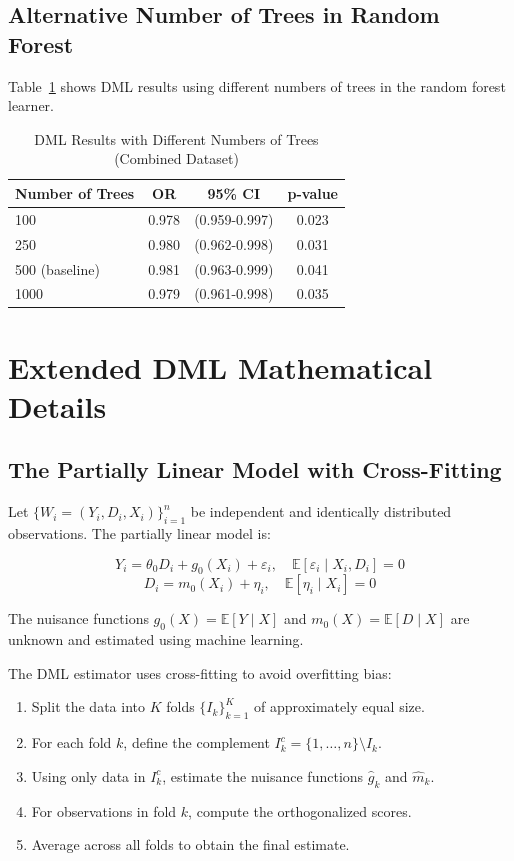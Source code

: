 \subsection{Alternative Number of Trees in Random Forest}

Table~\ref{tab:appendix_trees} shows DML results using different numbers of trees in the random forest learner.

\begin{table}[htbp]
	\centering
	\caption{DML Results with Different Numbers of Trees (Combined Dataset)}
	\label{tab:appendix_trees}
	\begin{tabular}{@{}lccc@{}}
		\toprule
		\textbf{Number of Trees} & \textbf{OR} & \textbf{95\% CI} & \textbf{p-value} \\
		\midrule
		100 & 0.978 & (0.959-0.997) & 0.023 \\
		250 & 0.980 & (0.962-0.998) & 0.031 \\
		500 (baseline) & 0.981 & (0.963-0.999) & 0.041 \\
		1000 & 0.979 & (0.961-0.998) & 0.035 \\
		\bottomrule
	\end{tabular}
\end{table}

\section{Extended DML Mathematical Details}

\subsection{The Partially Linear Model with Cross-Fitting}

Let $\{W_i = (Y_i, D_i, X_i)\}_{i=1}^n$ be independent and identically distributed observations. The partially linear model is:

\[
Y_i = \theta_0 D_i + g_0(X_i) + \varepsilon_i, \quad \mathbb{E}[\varepsilon_i \mid X_i, D_i] = 0
\]
\[
D_i = m_0(X_i) + \eta_i, \quad \mathbb{E}[\eta_i \mid X_i] = 0
\]

The nuisance functions $g_0(X) = \mathbb{E}[Y \mid X]$ and $m_0(X) = \mathbb{E}[D \mid X]$ are unknown and estimated using machine learning.

The DML estimator uses cross-fitting to avoid overfitting bias:

\begin{enumerate}
	\item Split the data into $K$ folds $\{I_k\}_{k=1}^K$ of approximately equal size.
	\item For each fold $k$, define the complement $I_k^c = \{1,\ldots,n\} \setminus I_k$.
	\item Using only data in $I_k^c$, estimate the nuisance functions $\hat{g}_k$ and $\hat{m}_k$.
	\item For observations in fold $k$, compute the orthogonalized scores.
	\item Average across all folds to obtain the final estimate.
\end{enumerate}

